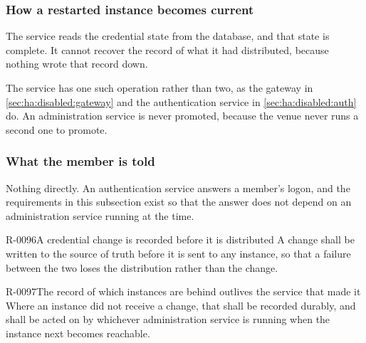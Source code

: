 \subsubsection{How a restarted instance becomes current}
\label{sec:ha:disabled:admin:recovery}

The service reads the credential state from the database, and that state is
complete. It cannot recover the record of what it had distributed, because
nothing wrote that record down.

The service has one such operation rather than two, as the gateway in
\cref{sec:ha:disabled:gateway} and the authentication service in
\cref{sec:ha:disabled:auth} do. An administration service is never promoted,
because the venue never runs a second one to promote.

\subsubsection{What the member is told}
\label{sec:ha:disabled:admin:member}

Nothing directly. An authentication service answers a member's logon, and the
requirements in this subsection exist so that the answer does not depend on an
administration service running at the time.

\begin{requirement}{R-0096}{A credential change is recorded before it is distributed}
  A change shall be written to the source of truth before it is sent to any
  instance, so that a failure between the two loses the distribution rather than
  the change.
\end{requirement}

\begin{requirement}{R-0097}{The record of which instances are behind outlives the service that made it}
  Where an instance did not receive a change, that shall be recorded durably, and
  shall be acted on by whichever administration service is running when the
  instance next becomes reachable.
\end{requirement}


